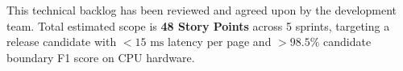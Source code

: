 \documentclass[11pt,a4paper]{article}
\begin{document}
\vspace{1.2em}

\begin{tcolorbox}[colback=NavyBlue!5, colframe=NavyBlue, arc=4pt, boxrule=1pt, title={\textbf{Engineering Sign-Off \& Commitment}}]
\small
This technical backlog has been reviewed and agreed upon by the development team. Total estimated scope is \textbf{48 Story Points} across 5 sprints, targeting a release candidate with $<15\text{ ms}$ latency per page and $>98.5\%$ candidate boundary F1 score on CPU hardware.
\end{tcolorbox}
\end{document}
